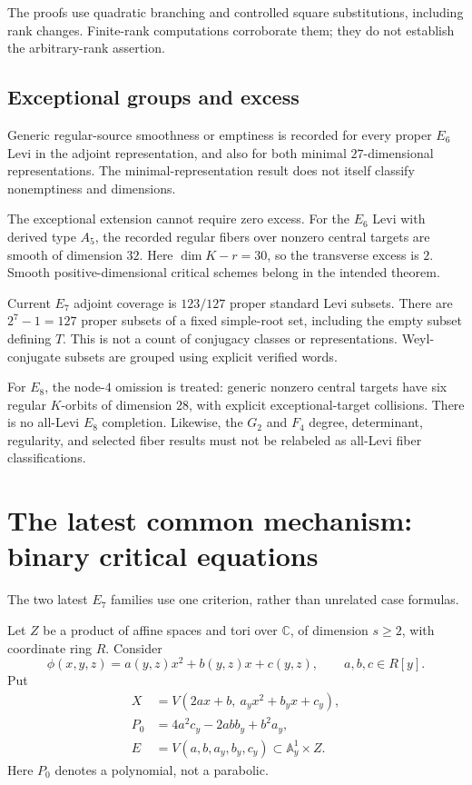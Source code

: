\documentclass[11pt]{article}
\newcommand{\C}{\mathbb C}
\begin{document}
The proofs use quadratic branching and controlled square substitutions, including rank changes. Finite-rank computations corroborate them; they do not establish the arbitrary-rank assertion.

\subsection{Exceptional groups and excess}

Generic regular-source smoothness or emptiness is recorded for every proper $E_6$ Levi in the adjoint representation, and also for both minimal $27$-dimensional representations. The minimal-representation result does not itself classify nonemptiness and dimensions.

The exceptional extension cannot require zero excess. For the $E_6$ Levi with derived type $A_5$, the recorded regular fibers over nonzero central targets are smooth of dimension $32$. Here $\dim K-r=30$, so the transverse excess is $2$. Smooth positive-dimensional critical schemes belong in the intended theorem.

Current $E_7$ adjoint coverage is $123/127$ proper standard Levi subsets. There are $2^7-1=127$ proper subsets of a fixed simple-root set, including the empty subset defining $T$. This is not a count of conjugacy classes or representations. Weyl-conjugate subsets are grouped using explicit verified words.

For $E_8$, the node-$4$ omission is treated: generic nonzero central targets have six regular $K$-orbits of dimension $28$, with explicit exceptional-target collisions. There is no all-Levi $E_8$ completion. Likewise, the $G_2$ and $F_4$ degree, determinant, regularity, and selected fiber results must not be relabeled as all-Levi fiber classifications.

\section{The latest common mechanism: binary critical equations}

The two latest $E_7$ families use one criterion, rather than unrelated case formulas.

Let $Z$ be a product of affine spaces and tori over $\C$, of dimension $s\ge2$, with coordinate ring $R$. Consider
\[
 \phi(x,y,z)=a(y,z)x^2+b(y,z)x+c(y,z),\qquad a,b,c\in R[y].
\]
Put
\begin{align*}
 X&=V(2ax+b,\ a_yx^2+b_yx+c_y),\\
 P_0&=4a^2c_y-2abb_y+b^2a_y,\\
 E&=V(a,b,a_y,b_y,c_y)\subset\mathbb A^1_y\times Z.
\end{align*}
Here $P_0$ denotes a polynomial, not a parabolic.
\end{document}
